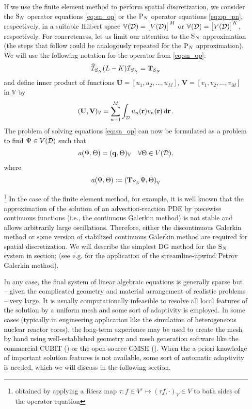 If we use the finite element method to perform spatial discretization, we consider the $\SN$ operator equations 
\eqref{eq:sn_op} or the $\PN$ operator equations \eqref{eq:op_pn}, respectively, in a suitable Hilbert space
$\mathbb{V}(\VV) = \bigl[V(\VV)\bigr]^M$ or $\mathbb{V}(\VV) = \bigl[V(\VV)\bigr]^K$, respectively. For concreteness,
let us limit our attention to the $\SN$ approximation (the steps that follow could be analogously repeated for
the $\PN$ approximation). We will use the following notation for the operator from \eqref{eq:sn_op}:
$$
	\PihSN (L-K) \PiSN = \mat{T}_{S_N}
$$ 
and define inner product of functions $\mathbf{U} = [u_1,u_2,\ldots,u_M]$, $\mathbf{V} = [v_1,v_2,\ldots,v_M]$ in
$\mathbb{V}$ by 
$$
\ip{\mathbb{V}}{\mathbf{U},\mathbf{V}} = \sum_{n=1}^M \int_{\VV} u_n(\br) v_n(\br)\,\d{\br}.
$$
The problem of solving equations \eqref{eq:sn_op} can now be formulated as a problem
to find $\Psi \in V(\VV)$ such that
\begin{equation}\label{eq:weak1}
	a(\Psi,\Theta) = (\mat{q}, \Theta)_\mathbb{V} \quad \forall \Theta\in V(\VV),
\end{equation}
where
$$
	a(\Psi,\Theta) := \left(\mat{T}_{S_N} \Psi, \Theta\right)_\mathbb{V}
$$
  
\footnote{obtained by applying a Riesz map $\tau : f\in V' \mapsto (\tau f,\cdot)_V \in V$ to both sides of the
operator equation} In the case of the finite element method, for example, it is well known that the approximation of the
solution of an advection-reaction PDE by piecewise continuous functions (i.e., the continuous Galerkin method) is not
stable and allows arbitrarily large oscillations. Therefore, either the discontinuous Galerkin method or some version of
stabilized continuous Galerkin method are required for spatial discretization. We will describe the simplest DG method
for the $\SN$ system in \alert{section}; (see e.g. \cite{Meinkohn} for the application of the streamline-upwind Petrov
Galerkin method).


In any case, the final system of linear algebraic equations is generally sparse but -- given the complicated geometry
and material arrangement of realistic problems -- very large. It is usually computationally infeasible to resolve all
local features of the solution by a uniform mesh and some sort of adaptivity is employed. In some cases (typically in
engineering application like the simulation of heterogeneous nuclear reactor cores), the long-term experience may be
used to create the mesh by hand using well-established geometry and mesh generation software like the commercial CUBIT
(\cite{CUBIT}) or the open-source GMSH (\cite{GMSH}). When the a-priori knowledge of important solution features is not
available, some sort of automatic adaptivity is needed, which we will discuss in the following section.

